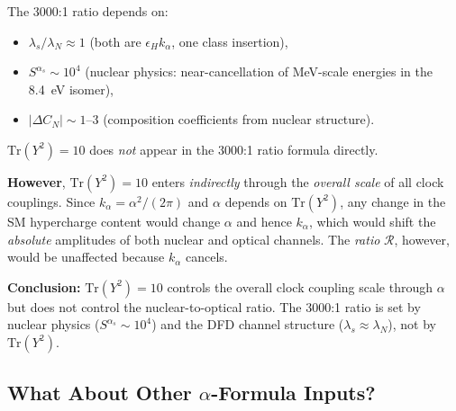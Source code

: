 \documentclass[11pt]{article}
\newcommand{\kalpha}{k_\alpha}
\theoremstyle{definition}
\theoremstyle{remark}
\begin{document}
\begin{tcolorbox}[colback=blue!5!white, colframe=blue!60!black,
  title={Answer: Not Directly, But Through a Shared Architecture}]
The 3000:1 ratio depends on:
\begin{itemize}
\item $\lambda_s / \lambda_N \approx 1$ (both are $\epsilon_H \kalpha$,
  one class insertion),
\item $S^{\alpha_s} \sim 10^4$ (nuclear physics: near-cancellation of
  MeV-scale energies in the 8.4~eV isomer),
\item $|\Delta C_N| \sim 1$--3 (composition coefficients from nuclear
  structure).
\end{itemize}

$\mathrm{Tr}(Y^2) = 10$ does \emph{not} appear in the 3000:1 ratio
formula directly.

\textbf{However}, $\mathrm{Tr}(Y^2) = 10$ enters \emph{indirectly}
through the \emph{overall scale} of all clock couplings. Since
$\kalpha = \alpha^2/(2\pi)$ and $\alpha$ depends on $\mathrm{Tr}(Y^2)$,
any change in the SM hypercharge content would change $\alpha$ and hence
$\kalpha$, which would shift the \emph{absolute} amplitudes of both
nuclear and optical channels. The \emph{ratio} $\mathcal{R}$, however,
would be unaffected because $\kalpha$ cancels.

\textbf{Conclusion:} $\mathrm{Tr}(Y^2) = 10$ controls the overall clock
coupling scale through $\alpha$ but does not control the nuclear-to-optical
ratio. The 3000:1 ratio is set by nuclear physics ($S^{\alpha_s} \sim 10^4$)
and the DFD channel structure ($\lambda_s \approx \lambda_N$), not by
$\mathrm{Tr}(Y^2)$.
\end{tcolorbox}

\subsection{What About Other $\alpha$-Formula Inputs?}
\end{document}
